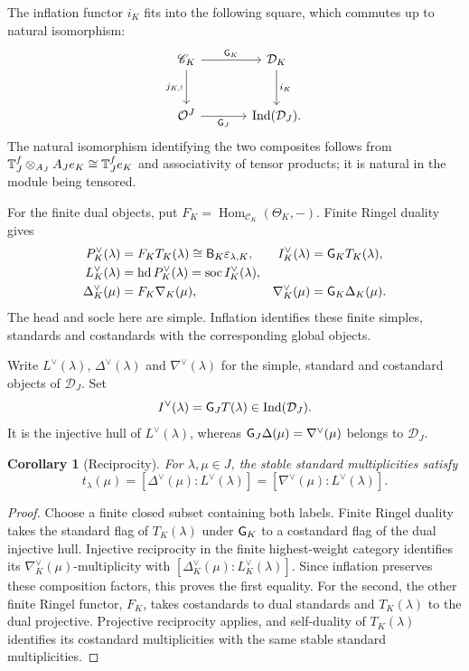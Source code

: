 \documentclass[11pt,reqno]{amsart}
\newcommand{\OO}{\mathcal O}\newcommand{\CC}{\mathscr C}\newcommand{\RR}{\mathcal R}\newcommand{\DD}{\mathcal D}
\newcommand{\Hom}{\operatorname{Hom}}\newcommand{\End}{\operatorname{End}}\newcommand{\Ext}{\operatorname{Ext}}
\newtheorem{corollary}[theorem]{Corollary}
\theoremstyle{definition}
\theoremstyle{remark}
\numberwithin{equation}{section}
\begin{document}
The inflation functor $i_K$ fits into the following square, which
commutes up to natural isomorphism:
\begin{equation}\label{eq:ringel-square}
\begin{tikzcd}[column sep=large,row sep=large]
 \CC_K \arrow[r,"\GK"] \arrow[d,"j_{K,!}"'] &
 \DD_K \arrow[d,"i_K"] \\
 \OO^J \arrow[r,"\GJ"'] & \Ind(\DD_J).
\end{tikzcd}
\end{equation}
The natural isomorphism identifying the two composites follows from
$\mathbb T_J^f\otimes_{A_J}A_Je_K\cong\mathbb T_J^fe_K$ and associativity of tensor
products; it is natural in the module being tensored.

For the finite dual objects, put
$F_K=\Hom_{\CC_K}(\Theta_K,-)$. Finite Ringel duality
\cite[Definition~4.9, Theorem~4.10]{BS} gives
\[
\begin{aligned}
 P_K^\vee(\lambda)&=F_KT_K(\lambda)\cong\mathsf B_K\varepsilon_{\lambda,K},
 & I_K^\vee(\lambda)&=\mathsf G_K T_K(\lambda),\\
 L_K^\vee(\lambda)&=\operatorname{hd}P_K^\vee(\lambda)
                 =\operatorname{soc}I_K^\vee(\lambda),\\
 \Delta_K^\vee(\mu)&=F_K\nabla_K(\mu),
 & \nabla_K^\vee(\mu)&=\mathsf G_K\Delta_K(\mu).
\end{aligned}
\]
The head and socle here are simple. Inflation identifies these finite
simples, standards and costandards with the corresponding global objects.

Write $L^\vee(\lambda)$, $\Delta^\vee(\lambda)$ and
$\nabla^\vee(\lambda)$ for the simple, standard and costandard objects
of $\DD_J$. Set
\[
 I^\vee(\lambda)=\GJ T(\lambda)
                  \in\Ind(\DD_J).
\]
It is the injective hull of $L^\vee(\lambda)$, whereas
$\mathsf G_J\Delta(\mu)=\nabla^\vee(\mu)$ belongs to $\DD_J$.

\begin{corollary}[Reciprocity]\label{thm:dual-reciprocity}
For $\lambda,\mu\in J$, the stable standard multiplicities satisfy
\begin{equation}\label{eq:global-reciprocity}
 t_\lambda(\mu)=
 [\Delta^\vee(\mu):L^\vee(\lambda)]
 = [\nabla^\vee(\mu):L^\vee(\lambda)].
\end{equation}
\end{corollary}

\begin{proof}
Choose a finite closed subset containing both labels. Finite Ringel duality
takes the standard flag of $T_K(\lambda)$ under $\mathsf G_K$ to a costandard flag of the
dual injective hull. Injective reciprocity in the finite highest-weight
category identifies its $\nabla_K^\vee(\mu)$-multiplicity with
$[\Delta_K^\vee(\mu):L_K^\vee(\lambda)]$. Since inflation preserves
these composition factors, this proves the first equality. For the
second, the other finite Ringel functor,
$F_K$, takes costandards to dual standards and
$T_K(\lambda)$ to the dual projective. Projective reciprocity applies,
and self-duality of $T_K(\lambda)$ identifies its costandard
multiplicities with the same stable standard multiplicities.
\end{proof}
\end{document}
